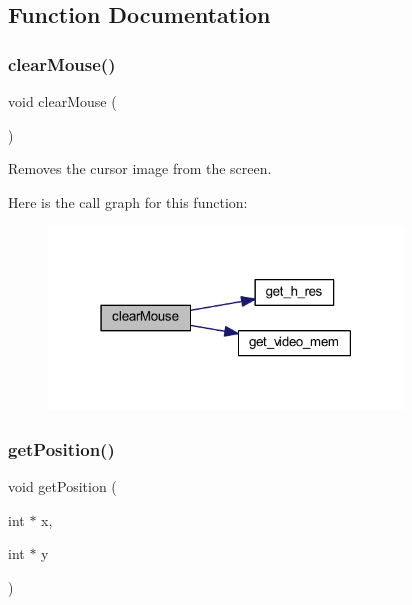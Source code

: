 \subsection{Function Documentation}
\mbox{\label{group__cursor_gaf48e820503f0becc55d9eb740bffe3e8}} 
\subsubsection{\texorpdfstring{clearMouse()}{clearMouse()}}
{\footnotesize\ttfamily void clear\+Mouse (\begin{DoxyParamCaption}{ }\end{DoxyParamCaption})}



Removes the cursor image from the screen. 

Here is the call graph for this function\+:
\nopagebreak
\begin{figure}[H]
\begin{center}
\leavevmode
\includegraphics[width=267pt]{group__cursor_gaf48e820503f0becc55d9eb740bffe3e8_cgraph}
\end{center}
\end{figure}
\mbox{\label{group__cursor_gac47a960acd2af3996c2b28d8150dcd8c}} 
\subsubsection{\texorpdfstring{getPosition()}{getPosition()}}
{\footnotesize\ttfamily void get\+Position (\begin{DoxyParamCaption}\item[{int $\ast$}]{x,  }\item[{int $\ast$}]{y }\end{DoxyParamCaption})}



